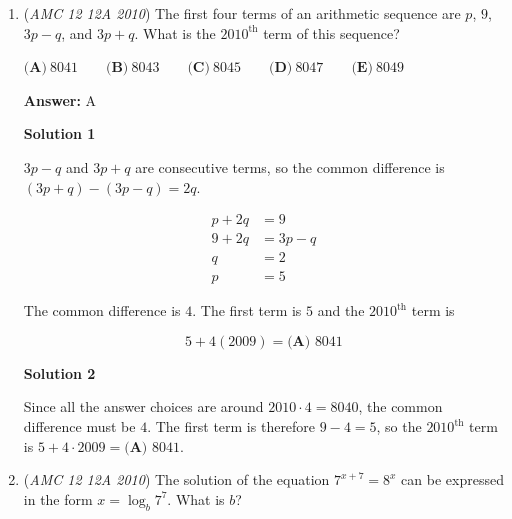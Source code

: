 \begin{enumerate}
 Hence the total volume of the cuts is $3(2 \times 2 \times 3) - 2(2\times 2\times 2) = 36 - 16 = 20$.

 Therefore the volume of the rest of the cube is $3^3 - 20 = 27 - 20 = \boxed{7\ \textbf{(A)}}$.

 



\textbf{Solution 4}

We can visualize the final figure and see a cubic frame. We can find the volume of the figure by adding up the volumes of the edges and corners.

 Each edge can be seen as a $2\times 0.5\times 0.5$ box, and each corner can be seen as a $0.5\times 0.5\times 0.5$ box.

 $12\cdot{\frac{1}{2}} + 8\cdot{\frac{1}{8}} = 6+1 = \boxed{7\ \textbf{(A)}}$.

 


	\item (\textit{AMC 12 12A 2010}) The first four terms of an arithmetic sequence are $p$, $9$, $3p-q$, and $3p+q$. What is the $2010^\text{th}$ term of this sequence?


 $\textbf{(A)}\ 8041 \qquad \textbf{(B)}\ 8043 \qquad \textbf{(C)}\ 8045 \qquad \textbf{(D)}\ 8047 \qquad \textbf{(E)}\ 8049$

 \textbf{Answer: }A



\textbf{Solution 1}

$3p-q$ and $3p+q$ are consecutive terms, so the common difference is $(3p+q)-(3p-q) = 2q$.

 
 \begin{align*}p+2q &= 9\\ 9+2q &= 3p-q\\ q&=2\\ p&=5\end{align*}


 The common difference is $4$. The first term is $5$ and the $2010^\text{th}$ term is

 
 \[5+4(2009) = \boxed{\textbf{(A) }8041}\]




\textbf{Solution 2}

Since all the answer choices are around $2010 \cdot 4 = 8040$, the common difference must be $4$. The first term is therefore $9 - 4 = 5$, so the $2010^\text{th}$ term is $5 + 4 \cdot 2009 = \boxed{\textbf{(A) }8041}$.

 


	\item (\textit{AMC 12 12A 2010}) The solution of the equation $7^{x+7} = 8^x$ can be expressed in the form $x = \log_b 7^7$. What is $b$?



\end{enumerate}
